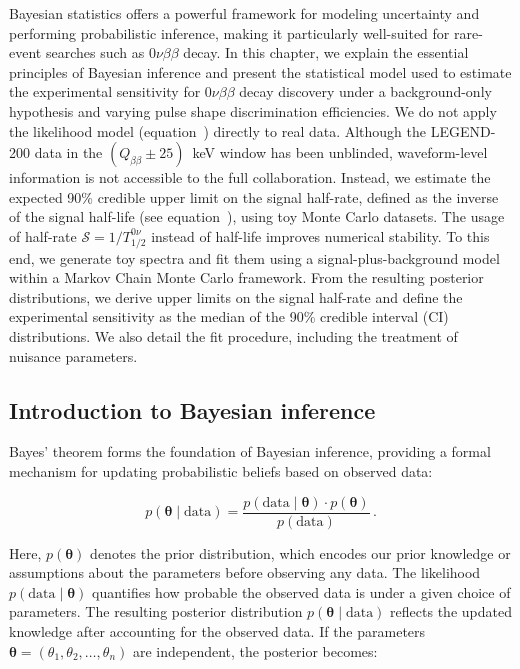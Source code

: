 Bayesian statistics offers a powerful framework for modeling uncertainty and performing probabilistic inference, making it particularly well-suited for rare-event searches such as $0 \nu \beta \beta$ decay. 
In this chapter, we explain the essential principles of Bayesian inference and present the statistical model used to estimate the experimental sensitivity for $0 \nu \beta \beta$ decay discovery under a background-only hypothesis and varying pulse shape discrimination efficiencies. 
We do not apply the likelihood model (equation~) directly to real data. Although the LEGEND-200 data in the $(Q_{\beta \beta} \pm 25)$~keV window has been unblinded, waveform-level information is not accessible to the full collaboration. Instead, we estimate the expected 90\% credible upper limit on the signal half-rate, defined as the inverse of the signal half-life (see equation~), using toy Monte Carlo datasets. The usage of half-rate $\mathcal{S} = 1 / T^{0 \nu}_{1/2}$ instead of half-life improves numerical stability. 
To this end, we generate toy spectra and fit them using a signal-plus-background model within a Markov Chain Monte Carlo framework. From the resulting posterior distributions, we derive upper limits on the signal half-rate and define the experimental sensitivity as the median of the 90\% credible interval (CI) distributions. We also detail the fit procedure, including the treatment of nuisance parameters. 


\subsection{Introduction to Bayesian inference}

Bayes' theorem forms the foundation of Bayesian inference, providing a formal mechanism for updating probabilistic beliefs based on observed data:

\begin{equation}
\label{eq:bayes_theorem}
	p(\boldsymbol{\theta} \mid \mathrm{data}) = \frac{p(\mathrm{data} \mid \boldsymbol{\theta}) \cdot p(\boldsymbol{\theta})}{p(\mathrm{data})} \,.
\end{equation}

\noindent Here, $p(\boldsymbol{\theta})$ denotes the prior distribution, which encodes our prior knowledge or assumptions about the parameters before observing any data. The likelihood $p(\mathrm{data} \mid \boldsymbol{\theta})$ quantifies how probable the observed data is under a given choice of parameters. The resulting posterior distribution $p(\boldsymbol{\theta} \mid \mathrm{data})$ reflects the updated knowledge after accounting for the observed data. If the parameters $\boldsymbol{\theta} = (\theta_1, \theta_2, \ldots, \theta_n)$ are independent, the posterior becomes:

